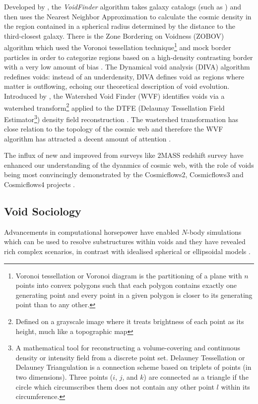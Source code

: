 \documentclass[fleqn,usenatbib]{mnras}
\begin{document}
Developed by \cite{el-ad_voids_1997}, the \textit{VoidFinder} algorithm takes galaxy catalogs (such as \cite{pan_cosmic_2012}) and then uses the Nearest Neighbor Approximation to calculate the cosmic density in the region contained in a spherical radius determined by the distance to the third-closest galaxy. There is the Zone Bordering on Voidness (ZOBOV) algorithm which used the Voronoi tessellation technique\footnote{Voronoi tessellation or Voronoi diagram is the partitioning of a plane with $ n $ points into convex polygons such that each polygon contains exactly one generating point and every point in a given polygon is closer to its generating point than to any other.} and mock border particles in order to categorize regions based on a high-density contrasting border with a very low amount of bias \citep{neyrinck_zobov_2008}. The Dynamical void analysis (DIVA) algorithm \citep{lavaux_precision_2010} redefines voids: instead of an underdensity, DIVA defines void as regions where matter is outflowing, echoing our theoretical description of void evolution. Introduced by \cite{platen_cosmic_2007}, the Watershed Void Finder (WVF) identifies voids via a watershed transform\footnote{Defined on a grayscale image where it treats brightness of each point as its height, much like a topographic map} applied to the DTFE (Delaunay Tessellation Field Estimator\footnote{A mathematical tool for reconstructing a volume-covering and continuous density or intensity field from a discrete point set. Delauney Tessellation or Delauney Triangulation is a connection scheme based on triplets of points (in two dimensions). Three points ($ i $, $ j $, and $ k $) are connected as a triangle if the circle which circumscribes them does not contain any other point $ l $ within its circumference.}) density field reconstruction \citep{schaap_continuous_2000, van_de_weygaert_cosmic_2009}. The wastershed transformation has close relation to the topology of the cosmic web \citep{aragon-calvo_spine_2010} and therefore the WVF algorithm has attracted a decent amount of attention \citep{colberg_aspenamsterdam_2008, neyrinck_zobov_2008, sutter_observability_2015, nadathur_nature_2015}.

The influx of new and improved from surveys like 2MASS redshift survey have enhanced our understanding of the dyanmics of cosmic web, with the role of voids being most convincingly demonstrated by the Cosmicflows2, Cosmicflows3 and Cosmicflows4 projects \citep{tully_our_2008, courtois_three-dimensional_2012, kourkchi_cosmicflows-4_2020, kourkchi_cosmicflows-4_2022}.
\subsection{Void Sociology}
Advancements in computational horsepower have enabled $ N $-body simulations which can be used to resolve substructures within voids and they have revealed rich complex scenarios, in contrast with idealised spherical or ellipsoidal models \citep{mathis_voids_2002, gottlober_structure_2003, goldberg_simulating_2004, colberg_voids_2005, padilla_spatial_2005, ceccarelli_voids_2006, bos_darkness_2012, aragon-calvo_hierarchical_2013, sutter_observability_2015, wojtak_voids_2016}. 
\end{document}
